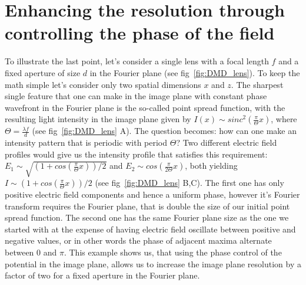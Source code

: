 \section{Enhancing the resolution through controlling the phase of the field}
To illustrate the last point, let's consider a single lens with a focal length $f$ and a fixed aperture of size $d$ in the Fourier plane (see fig~\ref{fig:DMD_lens}). To keep the math simple let's consider only two spatial dimensions $x$ and $z$. The sharpest single feature that one can make in the image plane with constant phase wavefront in the Fourier plane is the so-called point spread function, with the resulting light intensity in the image plane given by $I(x) \sim sinc^2(\frac{\pi}{\Theta} x)$, where $\Theta = \frac{\lambda f}{d}$ (see fig~\ref{fig:DMD_lens} A). The question becomes: how can one make an intensity pattern that is periodic with period $\Theta$? Two different electric field profiles would give us the intensity profile that satisfies this requirement: $E_1 \sim \sqrt{(1+cos(\frac{\pi}{\Theta}x))/2}$ and $E_2 \sim cos(\frac{\pi}{2\Theta} x)$, both yielding $I \sim (1+cos(\frac{\pi}{\Theta}x))/2$ (see fig~\ref{fig:DMD_lens} B,C). The first one has only positive electric field components and hence a uniform phase, however it's Fourier transform requires the Fourier plane, that is double the size of our initial point spread function. The second one has the same Fourier plane size as the one we started with at the expense of having electric field oscillate between positive and negative values, or in other words the phase of adjacent maxima alternate between $0$ and $\pi$. This example shows us, that using the phase control of the potential in the image plane, allows us to increase the image plane resolution by a factor of two for a fixed aperture in the Fourier plane.

